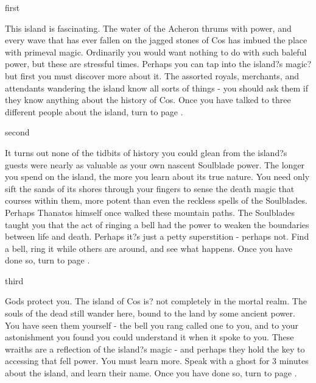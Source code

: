 \documentclass[greennotebook]{Kos}
\begin{document}

\startnotebook{\nButler{}}

\begin{page}{first}


This island is fascinating. The water of the Acheron thrums with power, and every wave that has ever fallen on the jagged stones of Cos has imbued the place with primeval magic. Ordinarily you would want nothing to do with such baleful power, but these are stressful times. Perhaps you can tap into the island?s magic? but first you must discover more about it. The assorted royals, merchants, and attendants wandering the island know all sorts of things - you should ask them if they know anything about the history of Cos. Once you have talked to three different people about the island, turn to page .


\end{page}

\begin{page}{second}

It turns out none of the tidbits of history you could glean from the island?s guests were nearly as valuable as your own nascent Soulblade power. The longer you spend on the island, the more you learn about its true nature. You need only sift the sands of its shores through your fingers to sense the death magic that courses within them, more potent than even the reckless spells of the Soulblades. Perhaps Thanatos himself once walked these mountain paths. The Soulblades taught you that the act of ringing a bell had the power to weaken the boundaries between life and death. Perhaps it?s just a petty superstition - perhaps not. Find a bell, ring it while others are around, and see what happens. Once you have done so, turn to page .

\end{page}

\begin{page}{third}

Gods protect you. The island of Cos is? not completely in the mortal realm. The souls of the dead still wander here, bound to the land by some ancient power. You have seen them yourself - the bell you rang called one to you, and to your astonishment you found you could understand it when it spoke to you. These wraiths are a reflection of the island?s magic - and perhaps they hold the key to accessing that fell power. You must learn more. Speak with a ghost for 3 minutes about the island, and learn their name. Once you have done so, turn to page .

\end{page}
\end{document}
